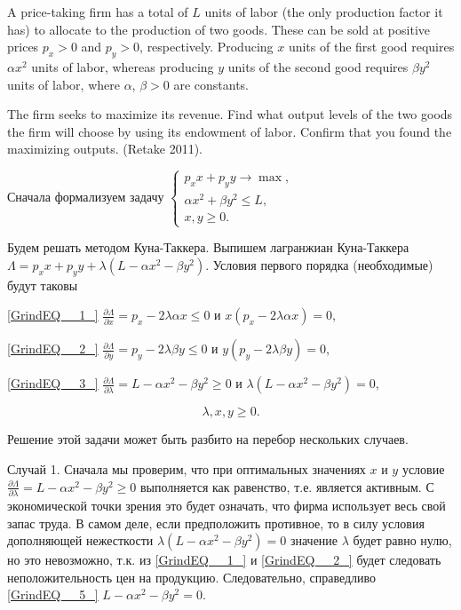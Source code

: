 \begin{problem}
A price-taking firm has a total of $L$ units of labor (the only production factor it has) to allocate to the production of two goods. These can be sold at positive prices $p_{x} >0$ and $p_{y} >0$, respectively. Producing $x$ units of the first good requires $\alpha x^{2} $ units of labor, whereas producing  $y$ units of the second good requires $\beta y^{2} $ units of labor, where $\alpha$, $\beta >0$ are constants.

The firm seeks to maximize its revenue. Find what output levels of the two goods the firm will choose by using its endowment of labor. Confirm that you found the maximizing outputs. (Retake 2011).
\end{problem}

\begin{solution}
Сначала формализуем задачу $\left\{\begin{array}{c} {p_{x} x+p_{y} y\to \max ,} \\ {\alpha x^{2} +\beta y^{2} \le L,} \\ {x,y\ge 0.} \end{array}\right. $

Будем решать методом Куна-Таккера. Выпишем лагранжиан Куна-Таккера $\Lambda =p_{x} x+p_{y} y+\lambda (L-\alpha x^{2} -\beta y^{2} )$. Условия первого порядка (необходимые) будут таковы

\eqref{GrindEQ__1_}  $\frac{\partial \Lambda }{\partial x} =p_{x} -2\lambda \alpha x\le 0$ и $x(p_{x} -2\lambda \alpha x)=0$,

\eqref{GrindEQ__2_}  $\frac{\partial \Lambda }{\partial y} =p_{y} -2\lambda \beta y\le 0$ и $y(p_{y} -2\lambda \beta y)=0$,

\eqref{GrindEQ__3_}  $\frac{\partial \Lambda }{\partial \lambda } =L-\alpha x^{2} -\beta y^{2} \ge 0$ и $\lambda (L-\alpha x^{2} -\beta y^{2} )=0$,

\begin{equation} \label{GrindEQ__4_} \lambda ,x,y\ge 0. \end{equation} 

Решение этой задачи может быть разбито на перебор нескольких случаев.

Случай 1. Сначала мы проверим, что при оптимальных значениях $x$ и $y$ условие $\frac{\partial \Lambda }{\partial \lambda } =L-\alpha x^{2} -\beta y^{2} \ge 0$ выполняется как равенство, т.е. является активным. С экономической точки зрения это будет означать, что фирма использует весь свой запас труда. В самом деле, если предположить противное, то в силу условия дополняющей нежесткости $\lambda (L-\alpha x^{2} -\beta y^{2} )=0$ значение $\lambda $ будет равно нулю, но это невозможно, т.к. из \eqref{GrindEQ__1_} и \eqref{GrindEQ__2_} будет следовать неположительность цен на продукцию. Следовательно, справедливо \eqref{GrindEQ__5_}  $L-\alpha x^{2} -\beta y^{2} =0$.


\end{solution}
